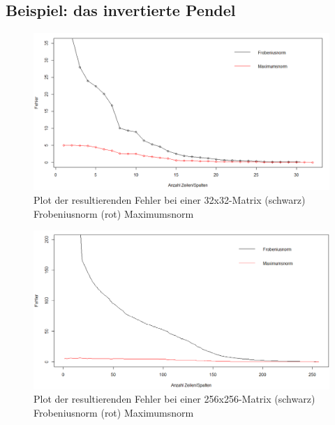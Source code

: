 \documentclass[12pt,a4paper,twoside]{article}
\begin{document}
\subsection{Beispiel: das invertierte Pendel}
	\begin{figure}[h]
		\center
		\includegraphics[scale=0.45]{Rplot_depth10.PNG}
		\caption{Plot der resultierenden Fehler bei einer 32x32-Matrix (schwarz) Frobeniusnorm (rot) Maximumsnorm}
	\end{figure}	
	\begin{figure}[h]
		\center
		\includegraphics[scale=0.4]{Rplot_depth16_2.PNG}
		\caption{Plot der resultierenden Fehler bei einer 256x256-Matrix (schwarz) Frobeniusnorm (rot) Maximumsnorm}
	\end{figure}	
\end{document}
